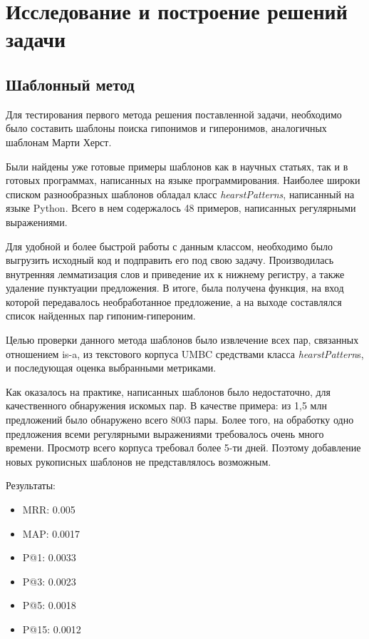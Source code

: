\section{Исследование и построение решений задачи}
\label{sec:Chapter_4} 
\large




\subsection{Шаблонный метод}

Для тестирования первого метода решения поставленной задачи, необходимо
было составить шаблоны поиска гипонимов и гиперонимов, аналогичных шаблонам
Марти Херст.

Были найдены уже готовые примеры шаблонов как в научных статьях, так и в
готовых программах, написанных на языке программирования. Наиболее широки
списком разнообразных шаблонов обладал класс \newline
\textit{hearstPatterns}, написанный на
языке Python. Всего в нем содержалось 48 примеров, написанных регулярными
выражениями.

Для удобной и более быстрой работы с данным классом, необходимо было
выгрузить исходный код и подправить его под свою задачу. Производилась
внутренняя лемматизация слов и приведение их к нижнему регистру, а также
удаление пунктуации предложения. В итоге, была получена функция, на вход
которой передавалось необработанное предложение, а на выходе составлялся
список найденных пар гипоним-гипероним.

Целью проверки данного метода шаблонов было извлечение всех пар, связанных
отношением is-a, из текстового корпуса UMBC средствами класса \textit{hearstPattern}s, и
последующая оценка выбранными метриками.

Как оказалось на практике, написанных шаблонов было недостаточно, для
качественного обнаружения искомых пар. В качестве примера: из 1,5 млн
предложений было обнаружено всего 8003 пары. Более того, на обработку одно
предложения всеми регулярными выражениями требовалось очень много времени.
Просмотр всего корпуса требовал более 5-ти дней. Поэтому добавление новых
рукописных шаблонов не представлялось возможным.

Результаты:

\begin{itemize}
\item MRR: 0.005
\item MAP: 0.0017
\item P@1: 0.0033
\item P@3: 0.0023
\item P@5: 0.0018
\item P@15: 0.0012
\end{itemize}

